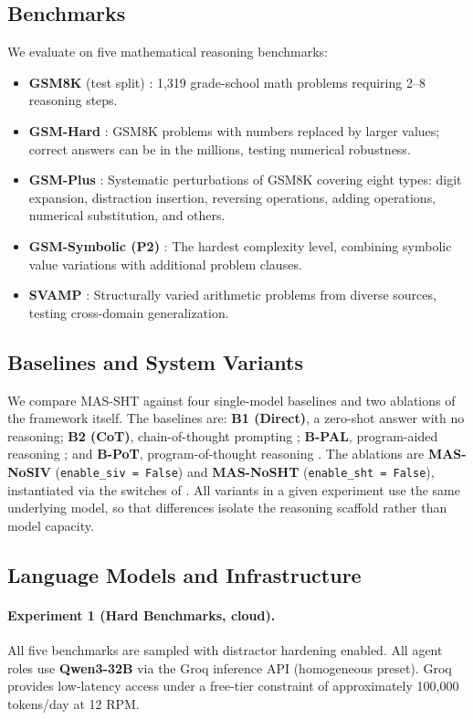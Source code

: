 \documentclass[11pt,a4paper]{article}
\begin{document}
\subsection{Benchmarks}
We evaluate on five mathematical reasoning benchmarks:
\begin{itemize}[leftmargin=*,itemsep=3pt]
    \item \textbf{GSM8K} (test split) \citep{cobbe2021gsm8k}: 1,319 grade-school math problems requiring 2--8 reasoning steps.
    \item \textbf{GSM-Hard} \citep{gao2023pal}: GSM8K problems with numbers replaced by larger values; correct answers can be in the millions, testing numerical robustness.
    \item \textbf{GSM-Plus} \citep{li2024gsmplus}: Systematic perturbations of GSM8K covering eight types: digit expansion, distraction insertion, reversing operations, adding operations, numerical substitution, and others.
    \item \textbf{GSM-Symbolic (P2)} \citep{shi2023gsmsymbolic}: The hardest complexity level, combining symbolic value variations with additional problem clauses.
    \item \textbf{SVAMP} \citep{patel2021svamp}: Structurally varied arithmetic problems from diverse sources, testing cross-domain generalization.
\end{itemize}
\subsection{Baselines and System Variants}
\label{sec:variants}
We compare MAS-SHT against four single-model baselines and two ablations of the framework itself.
The baselines are: \textbf{B1 (Direct)}, a zero-shot answer with no reasoning; \textbf{B2 (CoT)}, chain-of-thought prompting \citep{wei2022chain}; \textbf{B-PAL}, program-aided reasoning \citep{gao2023pal}; and \textbf{B-PoT}, program-of-thought reasoning \citep{chen2023program}.
The ablations are \textbf{MAS-NoSIV} (\texttt{enable\_siv = False}) and \textbf{MAS-NoSHT} (\texttt{enable\_sht = False}), instantiated via the switches of .
All variants in a given experiment use the same underlying model, so that differences isolate the reasoning scaffold rather than model capacity.
\subsection{Language Models and Infrastructure}
\paragraph{Experiment 1 (Hard Benchmarks, cloud).}
All five benchmarks are sampled with distractor hardening enabled.
All agent roles use \textbf{Qwen3-32B} via the Groq inference API (homogeneous preset).
Groq provides low-latency access under a free-tier constraint of approximately 100,000 tokens/day at 12 RPM.
\end{document}

